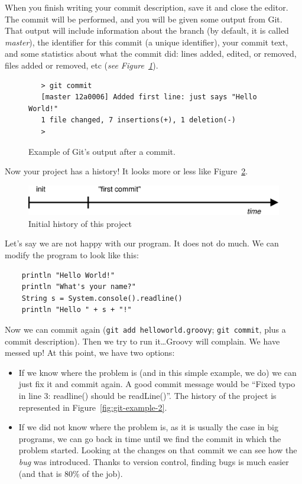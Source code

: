 When you finish writing your commit description, save it and close the
editor. The commit will be performed, and you will be given some
output from Git. That output will include information about the
branch (by default, it is called \emph{master}), the identifier for
this commit (a unique identifier), your commit text, and some 
statistics about what the commit did: lines added, edited, or removed,
files added or removed, etc (\emph{see
  Figure~\ref{fig:git-example-output}}). 

\begin{figure}[htbp!]
  \centering
  \begin{framed}
    \begin{verbatim}
   > git commit
   [master 12a0006] Added first line: just says "Hello World!"
   1 file changed, 7 insertions(+), 1 deletion(-)
   >
   \end{verbatim}
  \end{framed}
  \caption{Example of Git's output after a commit.}
  \label{fig:git-example-output}
\end{figure}

Now your project has a history! 
It looks more or less like Figure~\ref{fig:git-example-1}.

\begin{figure}[htbp!]
  \centering
  \includegraphics[width=\textwidth]{gfx/commit_history_1.eps}
  \caption{Initial history of this project}
  \label{fig:git-example-1}
\end{figure}

Let's say we are not happy with our program. It does not do much. We
can modify the program to look like this:

\begin{verbatim}
    println "Hello World!"
    println "What's your name?"
    String s = System.console().readline()
    println "Hello " + s + "!"
\end{verbatim}

Now we can commit again (\verb+git add helloworld.groovy+;
\verb+git commit+, plus a commit description). Then we try to run
it\ldots Groovy will complain. We have messed up! At this point, we
have two options:

\begin{itemize}
\item If we know where the problem is (and in this simple example, we
  do) we can just fix it and commit again. A good commit message would
  be ``Fixed typo in line 3: readline() should be readLine()''. The
  history of the project is represented in
  Figure~\ref{fig:git-example-2}. 
\item If we did not know where the problem is, as it is usually the
  case in big programs, we can go back in time
  until we find the commit in
  which the problem started. Looking at the changes on that commit we
  can see how the \emph{bug} was introduced. Thanks to version
  control, finding bugs is much easier (and that is 80\% of the job). 
\end{itemize}

